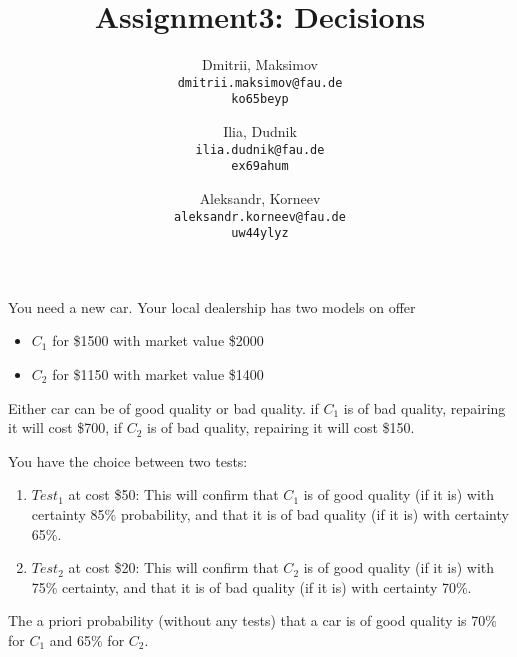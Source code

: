\documentclass{homework}
\title{Assignment3: Decisions}
\author{
  Dmitrii, Maksimov\\
  \texttt{dmitrii.maksimov@fau.de} \\
  \texttt{ko65beyp}
  \and
  Ilia, Dudnik\\
  \texttt{ilia.dudnik@fau.de}\\
  \texttt{ex69ahum}
  \and
  Aleksandr, Korneev\\
  \texttt{aleksandr.korneev@fau.de}\\
  \texttt{uw44ylyz}
}
\begin{document}
\maketitle

You need a new car. Your local dealership has two models on offer
\begin{itemize}
	\item $C_1$ for \$1500 with market value \$2000
	\item $C_2$ for \$1150 with market value \$1400
\end{itemize}
Either car can be of good quality or bad quality. if $C_1$ is of bad quality, repairing it will cost \$700, if $C_2$ is of bad quality, repairing it will cost \$150.

You have the choice between two tests:
\begin{enumerate}
	\item $Test_1$ at cost \$50: This will confirm that $C_1$ is of good quality (if it is) with certainty 85\% probability, and that it is of bad quality (if it is) with certainty 65\%.
	\item $Test_2$ at cost \$20: This will confirm that $C_2$ is of good quality (if it is) with 75\% certainty, and that it is of bad quality (if it is) with certainty 70\%.
\end{enumerate}
The a priori probability (without any tests) that a car is of good quality is 70\% for $C_1$ and 65\% for $C_2$. 
\end{document}
